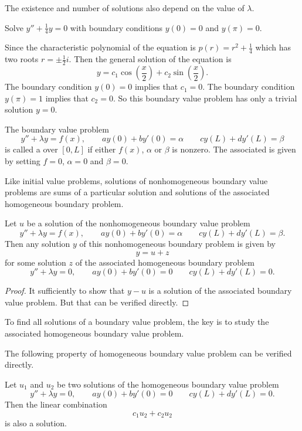 The existence and number of solutions also depend on the value of $\lambda$.

\begin{example}
  Solve $y'' + \frac{1}{4}y=0$ with boundary conditions $y(0)=0$ and $y(\pi)=0$.
\end{example}
\begin{solution}
  Since the characteristic polynomial of the equation is $p(r)=r^2+\frac14$ which has two roots $r=\pm \frac{1}{2}i$. Then the general solution of the equation is
  \[y=c_1\cos\left(\frac{x}{2}\right) +c_2\sin\left(\frac{x}{2}\right).\]
  The boundary condition $y(0)=0$ implies that $c_1   = 0$. The boundary condition $y(\pi)=1$ implies that $c_2=0$. So this boundary value problem has only a trivial solution $y=0$.
\end{solution}

The boundary value problem
\[y''+\lambda y=f(x), \qquad ay(0)+by'(0)=\alpha \qquad cy(L)+dy'(L)=\beta\]
is called a  over $[0, L]$ if either $f(x)$, $\alpha$ or $\beta$ is nonzero. The associated  is given by setting $f=0$, $\alpha=0$ and $\beta=0$.

Like initial value problems, solutions of nonhomogeneous boundary value problems are sums of a particular solution and solutions of the associated homogeneous boundary problem.

\begin{lemma}\label{lem:ReduceToHomogeneous}
  Let $u$ be a solution of the nonhomogeneous boundary value problem
  \[y''+\lambda y=f(x), \qquad ay(0)+by'(0)=\alpha \qquad cy(L)+dy'(L)=\beta.\] 
  Then any solution $y$ of this nonhomogeneous boundary problem is given by 
  \[y = u + z\] 
  for some solution $z$ of the associated homogeneous boundary problem
  \[y''+\lambda y=0, \qquad ay(0)+by'(0)=0 \qquad cy(L)+dy'(L)=0.\]
\end{lemma}
\begin{proof}
  It sufficiently to show that $y-u$ is a solution of the associated boundary value problem. But that can be verified directly.
\end{proof}

To find all solutions of a boundary value problem, the key is to study the associated homogeneous boundary value problem.

The following property of homogeneous boundary value problem can be verified directly.

\begin{theorem}
  Let $u_1$ and $u_2$ be two solutions of the homogeneous boundary value problem 
  \[y''+\lambda y=0, \qquad ay(0)+by'(0)=0 \qquad cy(L)+dy'(L)=0.\]
  Then the linear combination
  \[c_1u_2+c_2u_2\]
  is also a solution.
\end{theorem}

